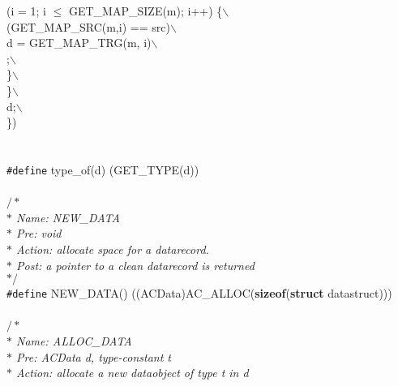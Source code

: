 \begin{flushleft}
\hspace*{2\indentation}{\bf for} (i = 1; i $\leq$ GET\_MAP\_SIZE(m); i++) \{$\backslash$\\
\hspace*{4\indentation}{\bf if} (GET\_MAP\_SRC(m,i) == src)$\backslash$\\
\hspace*{7\indentation}d = GET\_MAP\_TRG(m, i)$\backslash$\\
\hspace*{7\indentation}{\bf break};$\backslash$\\
\hspace*{4\indentation}\}$\backslash$\\
\hspace*{2\indentation}\}$\backslash$\\
\hspace*{2\indentation}d;$\backslash$\\
\})\mbox{}\\
\mbox{}\\
\mbox{}\\
{\tt \#define} type\_of(d) (GET\_TYPE(d))\mbox{}\\
\mbox{}\\
{$/\ast$\it{}\mbox{}\\
\hspace*{1\indentation}$\ast$ Name: NEW\_DATA\mbox{}\\
\hspace*{1\indentation}$\ast$ Pre: void\mbox{}\\
\hspace*{1\indentation}$\ast$ Action: allocate space for a datarecord.\mbox{}\\
\hspace*{1\indentation}$\ast$ Post: a pointer to a clean datarecord is returned\mbox{}\\
\hspace*{1\indentation}$\ast/$}\mbox{}\\
{\tt \#define} NEW\_DATA() ((ACData)AC\_ALLOC({\bf sizeof}({\bf struct} datastruct)))\mbox{}\\
\mbox{}\\
{$/\ast$\it{}\mbox{}\\
\hspace*{1\indentation}$\ast$ Name: ALLOC\_DATA\mbox{}\\
\hspace*{1\indentation}$\ast$ Pre: ACData d, type-constant t\mbox{}\\
\hspace*{1\indentation}$\ast$ Action: allocate a new dataobject of type t in d\mbox{}\\
}
\end{flushleft}
